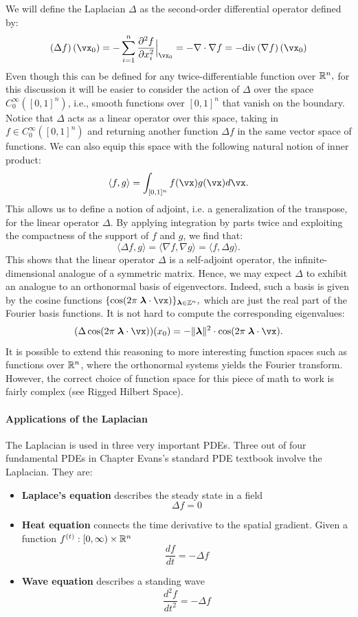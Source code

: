We will define the Laplacian $\Delta$ as the second-order differential operator  defined by:
$$
\left(\Delta f\right)\left(\vx_0\right) =
- \sum_{i=1}^{n} \frac{\partial^2 f}{\partial x_i^2}\Big|_{\vx_0} = 
- \nabla \cdot \nabla f 
= 
-\text{div}\left(\nabla f\right)\left(\vx_0\right)
$$
Even though this can be defined for any twice-differentiable function over $\mathbb{R}^n,$ for this discussion it will be easier to consider the action of $\Delta$ 
over the space $C^\infty_{0}([0,1]^n)$, i.e., smooth functions over $[0,1]^n$ that vanish on the boundary.
%
Notice that $\Delta$ acts as a linear operator over this space, taking in $f \in C^\infty_{0}([0,1]^n)$ and returning another function $\Delta f$ in the same vector space of functions. We can also equip this space with the following natural notion of inner product:
$$
\langle f, g \rangle =  \int_{[0,1]^n} f(\vx) g(\vx) d\vx.
$$
This allows us to define a notion of adjoint, i.e. a generalization of the transpose, for the linear operator $\Delta$. By applying integration by parts twice and exploiting the compactness of the support of $f$ and $g$, we find that:
$$
\langle \Delta f, g \rangle =  \langle \nabla f, \nabla g \rangle = \langle f, \Delta g \rangle. 
$$
This shows that the linear operator $\Delta$ is a self-adjoint operator, the infinite-dimensional analogue of a symmetric matrix. Hence, we may expect $\Delta$ to exhibit an analogue to an orthonormal basis of eigenvectors. Indeed, such a basis is given by the cosine functions 
$
\{\cos(2\pi \; \vlambda \cdot \vx)\}_{\vlambda \in \Z^n},
$
which are just the real part of the Fourier basis functions.
%
It is not hard to compute the corresponding eigenvalues:
$$
(\Delta \cos(2\pi \; \vlambda \cdot \vx))(x_0) = - \|\vlambda\|^2 \cdot \cos(2\pi \; \vlambda \cdot \vx).
$$
It is possible to extend this reasoning to more interesting function spaces such as functions over $\mathbb{R}^n$, where the orthonormal systems yields the Fourier transform. However, the correct choice of function space for this piece of math to work is fairly complex (see Rigged Hilbert Space). 

\paragraph{Applications of the Laplacian}

The Laplacian is used in three very important PDEs. Three out of four fundamental PDEs in Chapter \cite{evansPartialDifferentialEquations2022} Evans's standard PDE textbook involve the Laplacian. They are:
\begin{itemize}
    \item {\bf Laplace's equation} describes the steady state in a field
    $$\Delta f = 0$$

    \item {\bf Heat equation} connects the time derivative to the spatial gradient. Given a function $f^{(t)}: [0, \infty) \times \mathbb{R}^n$
    $$\frac{d f}{dt} = - \Delta f$$

    \item {\bf Wave equation} describes a standing wave
    $$\frac{d^2 f}{dt^2} = -\Delta f$$
\end{itemize}

